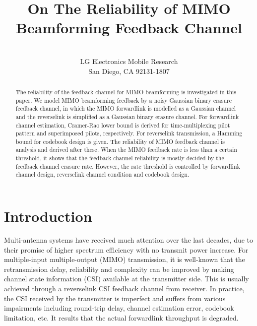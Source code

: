 \documentclass[10pt,fleqn, twocolumn]{IEEEtran}
\title{On The Reliability of MIMO Beamforming Feedback Channel}
\author{\\LG Electronics Mobile Research\\San Diego, CA 92131-1807}
\date{}
\begin{document}
\maketitle
\begin{abstract}\small
The reliability of the feedback channel for MIMO beamforming is
investigated in this paper. We model MIMO beamforming feedback by
a noisy Gaussian binary erasure feedback channel, in which the
MIMO forwardlink is modelled as a Gaussian channel and the
reverselink is simplified as a Gaussian binary erasure channel.
For forwardlink channel estimation, Cramer-Rao lower bound is
derived for time-multiplexing pilot pattern and superimposed
pilots, respectively. For reverselink transmission, a Hamming
bound for codebook design is given. The reliability of MIMO
feedback channel is analysis and derived after these. When the
MIMO feedback rate is less than a certain threshold, it shows that
the feedback channel reliability is mostly decided by the feedback
channel erasure rate. However, the rate threshold is controlled by
forwardlink channel design, reverselink channel condition and
codebook design.

\end{abstract}
\section{Introduction}
Multi-antenna systems have received much attention over the last
decades, due to their promise of higher spectrum efficiency with
no transmit power increase. For multiple-input multiple-output
(MIMO) transmission, it is well-known that the retransmission
delay, reliability and complexity can be improved by making
channel state information (CSI) available at the transmitter side.
This is usually achieved through a reverselink CSI feedback
channel from receiver. In practice, the CSI received by the
transmitter is imperfect and suffers from various impairments
including round-trip delay, channel estimation error, codebook
limitation, etc. It results that the actual forwardlink throughput
is degraded.
\end{document}
